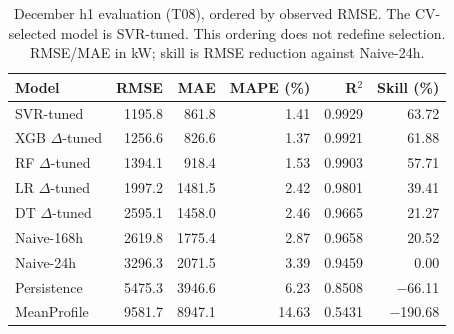 \begin{table}[tbp]\centering\small
\caption{December h1 evaluation (T08), ordered by observed RMSE. The CV-selected model is SVR-tuned. This ordering does not redefine selection. RMSE/MAE in kW; skill is RMSE reduction against Naive-24h.}\label{tab:test1}
\setlength{\tabcolsep}{4pt}
\begin{tabular}{lrrrrr}
\toprule
Model & RMSE & MAE & MAPE (\%) & R$^2$ & Skill (\%) \\
\midrule
SVR-tuned & \num{1195.8} & \num{861.8} & \num{1.41} & \num{0.9929} & \num{63.72} \\
XGB $\Delta$-tuned & \num{1256.6} & \num{826.6} & \num{1.37} & \num{0.9921} & \num{61.88} \\
RF $\Delta$-tuned & \num{1394.1} & \num{918.4} & \num{1.53} & \num{0.9903} & \num{57.71} \\
LR $\Delta$-tuned & \num{1997.2} & \num{1481.5} & \num{2.42} & \num{0.9801} & \num{39.41} \\
DT $\Delta$-tuned & \num{2595.1} & \num{1458.0} & \num{2.46} & \num{0.9665} & \num{21.27} \\
Naive-168h & \num{2619.8} & \num{1775.4} & \num{2.87} & \num{0.9658} & \num{20.52} \\
Naive-24h & \num{3296.3} & \num{2071.5} & \num{3.39} & \num{0.9459} & \num{0.00} \\
Persistence & \num{5475.3} & \num{3946.6} & \num{6.23} & \num{0.8508} & \num{-66.11} \\
MeanProfile & \num{9581.7} & \num{8947.1} & \num{14.63} & \num{0.5431} & \num{-190.68} \\
\bottomrule\end{tabular}
\end{table}
